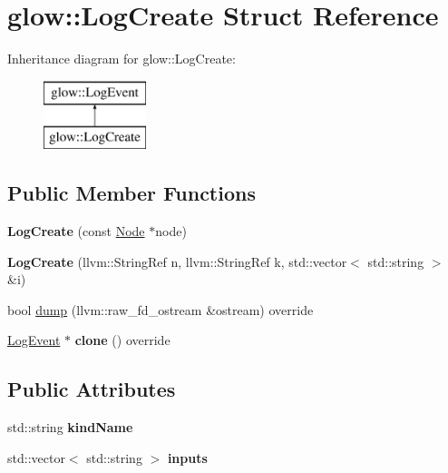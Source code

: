 \hypertarget{structglow_1_1_log_create}{}\section{glow\+:\+:Log\+Create Struct Reference}
\label{structglow_1_1_log_create}
Inheritance diagram for glow\+:\+:Log\+Create\+:\begin{figure}[H]
\begin{center}
\leavevmode
\includegraphics[height=2.000000cm]{structglow_1_1_log_create}
\end{center}
\end{figure}
\subsection*{Public Member Functions}
\begin{DoxyCompactItemize}
\item 
\mbox{\label{structglow_1_1_log_create_af8138ef62f08d437090865e93922f073}} 
{\bfseries Log\+Create} (const \hyperlink{classglow_1_1_node}{Node} $\ast$node)
\item 
\mbox{\label{structglow_1_1_log_create_a364384a0674769dedcff3341d34ff2d7}} 
{\bfseries Log\+Create} (llvm\+::\+String\+Ref n, llvm\+::\+String\+Ref k, std\+::vector$<$ std\+::string $>$ \&i)
\item 
bool \hyperlink{structglow_1_1_log_create_a42bb56ee4419b7a56af5a8e3f55c1a1f}{dump} (llvm\+::raw\+\_\+fd\+\_\+ostream \&ostream) override
\item 
\mbox{\label{structglow_1_1_log_create_a722306506a41d740a99dcc32d73f3be8}} 
\hyperlink{structglow_1_1_log_event}{Log\+Event} $\ast$ {\bfseries clone} () override
\end{DoxyCompactItemize}
\subsection*{Public Attributes}
\begin{DoxyCompactItemize}
\item 
\mbox{\label{structglow_1_1_log_create_a5f9991c2c4cbc8adbd2f56d43cdcb69b}} 
std\+::string {\bfseries kind\+Name}
\item 
\mbox{\label{structglow_1_1_log_create_a457abc405f755b354733f06975f5ce72}} 
std\+::vector$<$ std\+::string $>$ {\bfseries inputs}
\end{DoxyCompactItemize}


